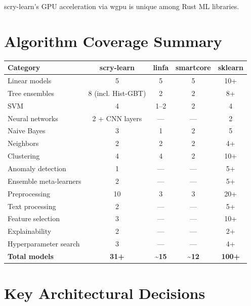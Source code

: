 \documentclass[11pt,a4paper]{article}
\begin{document}
scry-learn's GPU acceleration via wgpu is unique among Rust ML libraries.


\section{Algorithm Coverage Summary}

\begin{center}
\begin{tabular}{lcccc}
\toprule
\textbf{Category} & \textbf{scry-learn} & \textbf{linfa} & \textbf{smartcore} & \textbf{sklearn} \\
\midrule
Linear models & 5 & 5 & 5 & 10+ \\
Tree ensembles & 8 (incl. Hist-GBT) & 2 & 2 & 8+ \\
SVM & 4 & 1--2 & 2 & 4 \\
Neural networks & 2 + CNN layers & --- & --- & 2 \\
Naive Bayes & 3 & 1 & 2 & 5 \\
Neighbors & 2 & 2 & 2 & 4+ \\
Clustering & 4 & 4 & 2 & 10+ \\
Anomaly detection & 1 & --- & --- & 5+ \\
Ensemble meta-learners & 2 & --- & --- & 5+ \\
Preprocessing & 10 & 3 & 3 & 20+ \\
Text processing & 2 & --- & --- & 5+ \\
Feature selection & 3 & --- & --- & 10+ \\
Explainability & 2 & --- & --- & 2+ \\
Hyperparameter search & 3 & --- & --- & 4+ \\
\midrule
\textbf{Total models} & \textbf{31+} & \textbf{\textasciitilde15} & \textbf{\textasciitilde12} & \textbf{100+} \\
\bottomrule
\end{tabular}
\end{center}


\section{Key Architectural Decisions}
\end{document}
